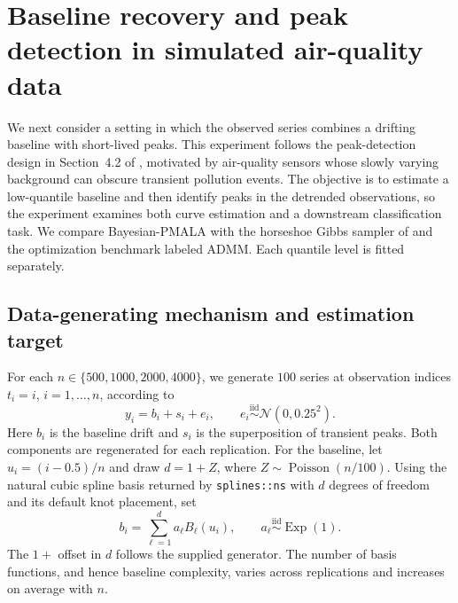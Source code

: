 \clearpage
\section{Baseline recovery and peak detection in simulated air-quality data}
\label{sec:air_simulation}

We next consider a setting in which the observed series combines a drifting baseline with short-lived peaks. This experiment follows the peak-detection design in Section~4.2 of \citet{brantley2020baseline}, motivated by air-quality sensors whose slowly varying background can obscure transient pollution events. The objective is to estimate a low-quantile baseline and then identify peaks in the detrended observations, so the experiment examines both curve estimation and a downstream classification task. We compare Bayesian-PMALA with the horseshoe Gibbs sampler of \citet{onizuka2024fast} and the optimization benchmark labeled ADMM. Each quantile level is fitted separately.

\subsection{Data-generating mechanism and estimation target}
\label{subsec:air_design}

For each $n\in\{500,1000,2000,4000\}$, we generate $100$ series at observation indices $t_i=i$, $i=1,\ldots,n$, according to
\begin{equation}
 y_i=b_i+s_i+e_i,\qquad e_i\stackrel{\mathrm{iid}}{\sim}\mathcal{N}(0,0.25^2).
 \label{eq:air_observation}
\end{equation}
Here $b_i$ is the baseline drift and $s_i$ is the superposition of transient peaks. Both components are regenerated for each replication. For the baseline, let $u_i=(i-0.5)/n$ and draw $d=1+Z$, where $Z\sim\operatorname{Poisson}(n/100)$. Using the natural cubic spline basis returned by \texttt{splines::ns} with $d$ degrees of freedom and its default knot placement, set
\begin{equation}
 b_i=\sum_{\ell=1}^{d}a_\ell B_\ell(u_i),
 \qquad a_\ell\stackrel{\mathrm{iid}}{\sim}\operatorname{Exp}(1).
 \label{eq:air_baseline}
\end{equation}
The $1+$ offset in $d$ follows the supplied generator. The number of basis functions, and hence baseline complexity, varies across replications and increases on average with $n$.

